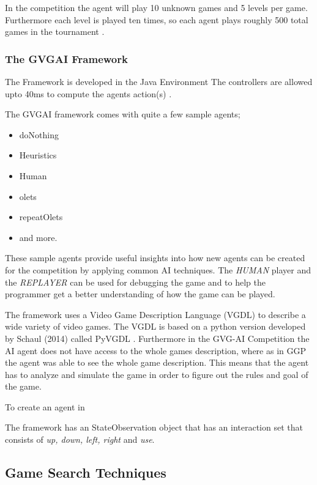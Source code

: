 \documentclass[journal]{IEEEtran}
\begin{document}
		In the competition the agent will play 10 unknown games and 5 levels per game. Furthermore each level is played ten times, so each agent plays roughly 500 total games in the tournament \cite{schuster2015mcts}.
		
	
	
	\subsubsection{The GVGAI Framework}
		The Framework is developed in the Java Environment
		The controllers are allowed upto 40ms to compute the agents action(s) \cite{perez2016GVGAICompetition, GVGAI}.
		
		The GVGAI framework comes with quite a few sample agents;
		
		\begin{itemize}
		    \item doNothing
		    \item Heuristics
		    \item Human
		    \item olets
		    \item repeatOlets
		    \item and more.
		\end{itemize}

		These sample agents provide useful insights into how new agents can be created for the competition by applying common AI techniques.
		The \textit{HUMAN} player and the \textit{REPLAYER} can be used for debugging the game and to help the programmer get a better understanding of how the game can be played.
		
		
		The framework uses a Video Game Description Language (VGDL) to describe a wide variety of video games. The VGDL is based on a python version developed by Schaul (2014) called PyVGDL \cite{schuster2015mcts}. Furthermore in the GVG-AI Competition the AI agent does not have access to the whole games description, where as in GGP the agent was able to see the whole game description. This means that the agent has to analyze and simulate the game in order to figure out the rules and goal of the game.
		
		To create an agent in 
		
		The framework has an StateObservation object that has an interaction set that consists of \textit{up, down, left, right} and \textit{use}.

	
		
	
	\subsection{Game Search Techniques}
\end{document}
